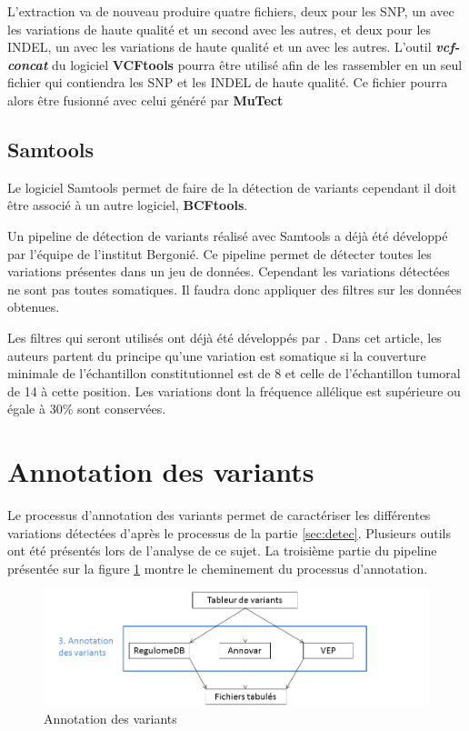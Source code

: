 L'extraction va de nouveau produire quatre fichiers, deux pour les SNP, un avec les variations de haute qualité et un second avec les autres, et deux pour les INDEL, un avec les variations de haute qualité et un avec les autres. L'outil \textit{\textbf{vcf-concat}} du logiciel \textbf{VCFtools} pourra être utilisé afin de les rassembler en un seul fichier qui contiendra les SNP et les INDEL de haute qualité. Ce fichier pourra alors être fusionné avec celui généré par \textbf{MuTect}

\subsection{Samtools}\label{subsec:sam}

Le logiciel Samtools permet de faire de la détection de variants cependant il doit être associé à un autre logiciel, \textbf{BCFtools}.

Un pipeline de détection de variants réalisé avec Samtools a déjà été développé par l'équipe de l'institut Bergonié. Ce pipeline permet de détecter toutes les variations présentes dans un jeu de données. Cependant les variations détectées ne sont pas toutes somatiques. Il faudra donc appliquer des filtres sur les données obtenues. 

Les filtres qui seront utilisés ont déjà été développés par \cite{Filtre}. Dans cet article, les auteurs partent du principe qu'une variation est somatique si la couverture minimale de l'échantillon constitutionnel est de 8 et celle de l'échantillon tumoral de 14 à cette position. Les variations dont la fréquence allélique est supérieure ou égale à 30\% sont conservées. 

\section{Annotation des variants}

Le processus d'annotation des variants permet de caractériser les différentes variations détectées d'après le processus de la partie \ref{sec:detec}. Plusieurs outils ont été présentés lors de l'analyse de ce sujet. La troisième partie du pipeline présentée sur la figure \ref{fig:part3} montre le cheminement du processus d'annotation.

\begin{figure}[h]
\centering
\includegraphics[scale=0.6]{Figures/partie3.png}
\caption{Annotation des variants}
\label{fig:part3}
\end{figure}

